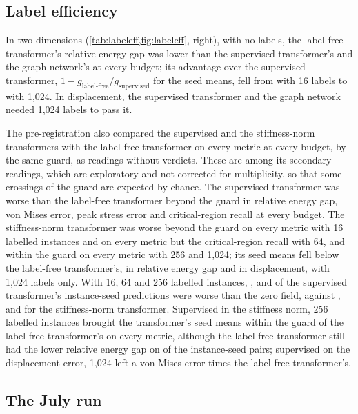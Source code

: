 \subsection{Label efficiency}\label{sec:results2d:labels}

In two dimensions (\cref{tab:labeleff,fig:labeleff}, right), with no labels, the label-free
transformer's relative energy gap was lower than the supervised transformer's and the graph
network's at every budget; its advantage over the supervised transformer,
$1-g_{\text{label-free}}/g_{\text{supervised}}$ for the seed means, fell from
\numCmAdvMax{} with 16 labels to \numCmAdvMin{} with 1,024. In displacement, the supervised
transformer and the graph network needed 1,024 labels to pass it.

The pre-registration also compared the supervised and the stiffness-norm transformers with
the label-free transformer on every metric at every budget, by the same guard, as readings
without verdicts. These are among its \numCmSecondary{} secondary readings, which are
exploratory and not corrected for multiplicity, so that some crossings of the guard are
expected by chance. The supervised transformer was worse than the label-free transformer
beyond the guard in relative energy gap, von Mises error, peak stress error and
critical-region recall at every budget. The stiffness-norm transformer was worse beyond the
guard on every metric with 16 labelled instances and on every metric but the
critical-region recall with 64, and within the guard on every metric with 256 and 1,024;
its seed means fell below the label-free transformer's, in relative energy gap and in
displacement, with 1,024 labels only. With 16, 64 and 256 labelled instances,
\numCmLabWorseSixteen{}, \numCmLabWorseSixtyFour{} and \numCmLabWorseTwoFiveSix{} of the
supervised transformer's \numCmPairs{} instance-seed predictions were worse than the zero
field, against \numCmKnormWorseSixteen{}, \numCmKnormWorseSixtyFour{} and
\numCmKnormWorseTwoFiveSix{} for the stiffness-norm transformer. Supervised in the stiffness
norm, 256 labelled instances brought the transformer's seed means within the guard of the
label-free transformer's on every metric, although the label-free transformer still had the
lower relative energy gap on \numPairCmFreeKnormGapTwoFiveSix{} of the instance-seed pairs;
supervised on the displacement error, 1,024 left a von Mises error \numCmLabOverFreeVm{}
times the label-free transformer's.

\subsection{The July run}\label{sec:results2d:july}

